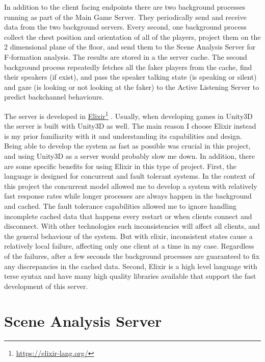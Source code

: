 \documentclass[]{simple-thesis}
\newcommand\fnurl[2]{%
  \href{#2}{#1}\footnote{\url{#2}}%
}
\begin{document}
In addition to the client facing endpoints there are two background processes running as part of the Main Game Server.
They periodically send and receive data from the two background servers.
Every second, one background process collect the chest position and orientation of all of the players, project them on the 2 dimensional plane of the floor, and send them to the Scene Analysis Server for F-formation analysis.
The results are stored in a the server cache.
The second background process repeatedly fetches all the faker players from the cache, find their speakers (if exist), and pass the speaker talking state (is speaking or silent) and gaze (is looking or not looking at the faker) to the Active Listening Server to predict backchannel behaviours.

The server is developed in \fnurl{Elixir}{https://elixir-lang.org/}.
Usually, when developing games in Unity3D the server is built with Unity3D as well.
The main reason I choose Elixir instead is my prior familiarity with it and understanding its capabilities and design.
Being able to develop the system as fast as possible was crucial in this project, and using Unity3D as a server would probably slow me down.
In addition, there are some specific benefits for using Elixir in this type of project.
First, the language is designed for concurrent and fault tolerant systems.
In the context of this project the concurrent model allowed me to develop a system with relatively fast response rates while longer processes are always happen in the background and cached.
The fault tolerance capabilities allowed me to ignore handling incomplete cached data that happens every restart or when clients connect and disconnect.
With other technologies such inconsistencies will affect all clients, and the general behaviour of the system.
But with elixir, inconsistent states cause a relatively local failure, affecting only one client at a time in my case.
Regardless of the failures, after a few seconds the background processes are guaranteed to fix any discrepancies in the cached data.
Second, Elixir is a high level language with terse syntax and have many high quality libraries available that support the fast development of this server.

\section{Scene Analysis Server}
\end{document}
